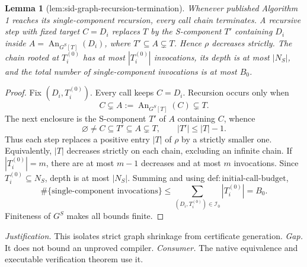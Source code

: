 \documentclass{article}
\newtheorem{lemma}{Lemma}
\begin{document}
\begin{lemma}[lem:sid-graph-recursion-termination]\label{lem:sid-graph-recursion-termination}
Whenever published Algorithm 1 reaches its single-component recursion, every call chain terminates. A recursive step with fixed target \(C=D_i\) replaces \(T\) by the S-component \(T'\) containing \(D_i\) inside \(A=\operatorname{An}_{G^S[T]}(D_i)\), where \(T'\subseteq A\subsetneq T\). Hence \(\rho\) decreases strictly. The chain rooted at \(T_i^{(0)}\) has at most \(|T_i^{(0)}|\) invocations, its depth is at most \(|N_S|\), and the total number of single-component invocations is at most \(B_0\).
\end{lemma}
\begin{proof}
Fix \((D_i,T_i^{(0)})\). Every call keeps \(C=D_i\). Recursion occurs only when
\[
 C\subsetneq A:=\operatorname{An}_{G^S[T]}(C)\subsetneq T.
\]
The next enclosure is the S-component \(T'\) of \(A\) containing \(C\), whence
\[
 \varnothing\ne C\subseteq T'\subseteq A\subsetneq T,\qquad |T'|\le|T|-1.
\]
Thus each step replaces a positive entry \(|T|\) of \(\rho\) by a strictly smaller one. Equivalently, \(|T|\) decreases strictly on each chain, excluding an infinite chain. If \(|T_i^{(0)}|=m\), there are at most \(m-1\) decreases and at most \(m\) invocations. Since \(T_i^{(0)}\subseteq N_S\), depth is at most \(|N_S|\). Summing and using \(\mathrm{def:initial\text{-}call\text{-}budget}\),
\[
 \#\{\text{single-component invocations}\}
 \le\sum_{(D_i,T_i^{(0)})\in\mathcal I_0}|T_i^{(0)}|=B_0.
\]
Finiteness of \(G^S\) makes all bounds finite.
\end{proof}
\par\smallskip\noindent \textit{Justification.} This isolates strict graph shrinkage from certificate generation. \textit{Gap.} It does not bound an unproved compiler. \textit{Consumer.} The native equivalence and executable verification theorem use it.
\end{document}
